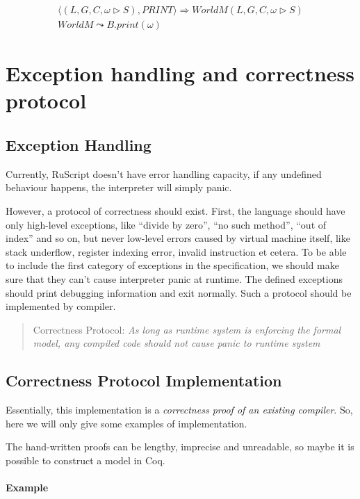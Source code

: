 \documentclass[]{article}
\numberwithin{equation}{section}
\numberwithin{figure}{section}
\numberwithin{table}{section}
\begin{document}
\begin{gather*}
  \langle (L, G, C, \omega \rhd S), PRINT\rangle \Rightarrow WorldM (L, G, C, \omega \rhd S) \\
  WorldM \leadsto B.print(\omega)
\end{gather*}

\section{Exception handling and correctness
protocol}\label{exception-handling-and-correctness-protocol}

\subsection{Exception Handling}\label{exception-handling}

Currently, RuScript doesn't have error handling capacity, if any
undefined behaviour happens, the interpreter will simply panic.

However, a protocol of correctness should exist. First, the language
should have only high-level exceptions, like ``divide by zero'', ``no
such method'', ``out of index'' and so on, but never low-level errors caused by
virtual machine itself, like stack underflow, register indexing error,
invalid instruction et cetera. To be able to include the first category of
exceptions in the specification, we should make sure that
they can't cause interpreter panic at runtime. The defined exceptions should
print debugging information and exit normally. Such a protocol should be implemented
by compiler.

\begin{quote}
Correctness Protocol: \emph{As long as runtime system is enforcing the
formal model, any compiled code should not cause panic to runtime
system} 
\end{quote}


\subsection{Correctness Protocol Implementation}

Essentially, this implementation is a \emph{correctness proof of an existing compiler}.
So, here we will only give some examples of implementation.

The hand-written proofs can be lengthy, imprecise and unreadable, so
maybe it is possible to construct a model in Coq.

\paragraph{Example}\label{example}
\end{document}
